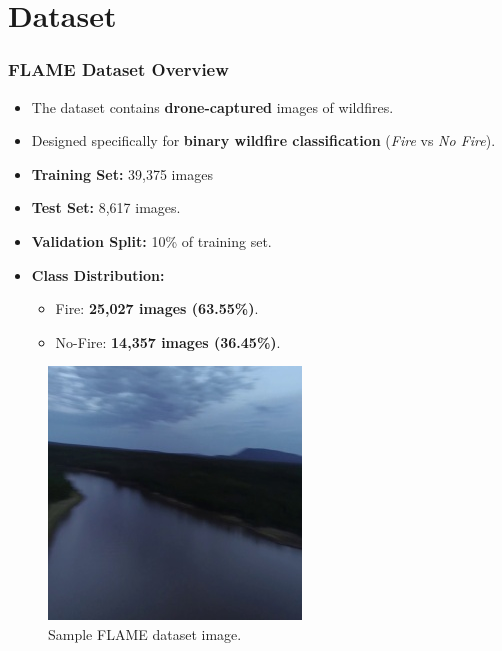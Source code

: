 \section{Dataset}
\label{sec:dataset}

\begin{frame}
    \frametitle{FLAME Dataset Overview}

    \begin{minipage}{0.58\textwidth}
        \begin{itemize}
            \item The dataset contains \textbf{drone-captured} images of wildfires.
            \item Designed specifically for \textbf{binary wildfire classification} (\textit{Fire} vs \textit{No Fire}).
            \item \textbf{Training Set:} 39,375 images
            \item \textbf{Test Set:} 8,617 images.
            \item \textbf{Validation Split:} 10\% of training set.
            \item \textbf{Class Distribution:}
                \begin{itemize}
                    \item Fire: \textbf{25,027 images (63.55\%)}.
                    \item No-Fire: \textbf{14,357 images (36.45\%)}.
                \end{itemize}
        \end{itemize}
    \end{minipage}
    \hfill
    \begin{minipage}{0.38\textwidth}
        \begin{figure}
            \centering
            \includegraphics[width=\textwidth]{images/sample}
            \caption{Sample FLAME dataset image.}
            \label{fig:sample}
        \end{figure}
    \end{minipage}
\end{frame}
